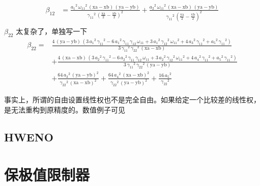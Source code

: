 \documentclass{book}
\begin{document}
\begin{example}
\begin{example}{}{}
\begin{example}
\begin{example}
\begin{example}
\begin{equation}
\begin{aligned}
        \beta_{12} & = \frac{{a_1 }^2 \,{\omega_{11} }^2 \,{\left(\mathrm{xa}-\mathrm{xb}\right)}\,{\left(\mathrm{ya}-\mathrm{yb}\right)}}{{\gamma_{11} }^2 \,{{\left(\frac{\mathrm{xa}}{2}-\frac{\mathrm{xb}}{2}\right)}}^2 }+\frac{{a_2 }^2 \,{\omega_{11} }^2 \,{\left(\mathrm{xa}-\mathrm{xb}\right)}\,{\left(\mathrm{ya}-\mathrm{yb}\right)}}{{\gamma_{11} }^2 \,{{\left(\frac{\mathrm{ya}}{2}-\frac{\mathrm{yb}}{2}\right)}}^2 } \\
    \end{aligned}
\end{equation}
$\beta_{22}$ 太复杂了，单独写一下
\begin{equation}
    \begin{aligned}
        \beta_{22} = & \frac{4\,{\left(\mathrm{ya}-\mathrm{yb}\right)}\,{\left(3\,{a_1 }^2 \,{\gamma_{11} }^2 -6\,{a_1 }^2 \,\gamma_{11} \,\gamma_{12} \,\omega_{11} +3\,{a_1 }^2 \,{\gamma_{12} }^2 \,{\omega_{11} }^2 +4\,{a_3 }^2 \,{\gamma_{11} }^2 +{a_5 }^2 \,{\gamma_{11} }^2 \right)}}{3\,{\gamma_{11} }^2 \,{\gamma_{22} }^2 \,{\left(\mathrm{xa}-\mathrm{xb}\right)}}  \\
                     & +\frac{4\,{\left(\mathrm{xa}-\mathrm{xb}\right)}\,{\left(3\,{a_2 }^2 \,{\gamma_{11} }^2 -6\,{a_2 }^2 \,\gamma_{11} \,\gamma_{12} \,\omega_{11} +3\,{a_2 }^2 \,{\gamma_{12} }^2 \,{\omega_{11} }^2 +4\,{a_4 }^2 \,{\gamma_{11} }^2 +{a_5 }^2 \,{\gamma_{11} }^2 \right)}}{3\,{\gamma_{11} }^2 \,{\gamma_{22} }^2 \,{\left(\mathrm{ya}-\mathrm{yb}\right)}} \\
                     & +\frac{64\,{a_3 }^2 \,{{\left(\mathrm{ya}-\mathrm{yb}\right)}}^2 }{{\gamma_{22} }^2 \,{{\left(\mathrm{xa}-\mathrm{xb}\right)}}^2 } + \frac{64\,{a_4 }^2 \,{{\left(\mathrm{xa}-\mathrm{xb}\right)}}^2 }{{\gamma_{22} }^2 \,{{\left(\mathrm{ya}-\mathrm{yb}\right)}}^2 }+\frac{16\,{a_5 }^2 }{{\gamma_{22} }^2 }
    \end{aligned}
\end{equation}

事实上，所谓的自由设置线性权也不是完全自由。如果给定一个比较差的线性权，是无法重构到原精度的。数值例子可见 \cite{RN133}

\subsection{HWENO}




\section{保极值限制器}

\end{example}
\end{example}
\end{example}
\end{example}
\end{example}
\end{document}
